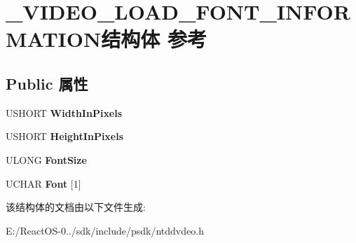 \hypertarget{struct___v_i_d_e_o___l_o_a_d___f_o_n_t___i_n_f_o_r_m_a_t_i_o_n}{}\section{\+\_\+\+V\+I\+D\+E\+O\+\_\+\+L\+O\+A\+D\+\_\+\+F\+O\+N\+T\+\_\+\+I\+N\+F\+O\+R\+M\+A\+T\+I\+O\+N结构体 参考}
\label{struct___v_i_d_e_o___l_o_a_d___f_o_n_t___i_n_f_o_r_m_a_t_i_o_n}
\subsection*{Public 属性}
\begin{DoxyCompactItemize}
\item 
\mbox{\label{struct___v_i_d_e_o___l_o_a_d___f_o_n_t___i_n_f_o_r_m_a_t_i_o_n_a880dea1af869b914246bb95a73a792c0}} 
U\+S\+H\+O\+RT {\bfseries Width\+In\+Pixels}
\item 
\mbox{\label{struct___v_i_d_e_o___l_o_a_d___f_o_n_t___i_n_f_o_r_m_a_t_i_o_n_a8b4ef44745b24d33287843552a8540c1}} 
U\+S\+H\+O\+RT {\bfseries Height\+In\+Pixels}
\item 
\mbox{\label{struct___v_i_d_e_o___l_o_a_d___f_o_n_t___i_n_f_o_r_m_a_t_i_o_n_a171cec19dac5781f29032a18f537b978}} 
U\+L\+O\+NG {\bfseries Font\+Size}
\item 
\mbox{\label{struct___v_i_d_e_o___l_o_a_d___f_o_n_t___i_n_f_o_r_m_a_t_i_o_n_ac704e562f302fa8428ef53182d7de11d}} 
U\+C\+H\+AR {\bfseries Font} \mbox{[}1\mbox{]}
\end{DoxyCompactItemize}


该结构体的文档由以下文件生成\+:\begin{DoxyCompactItemize}
\item 
E\+:/\+React\+O\+S-\/0../sdk/include/psdk/ntddvdeo.\+h\end{DoxyCompactItemize}

